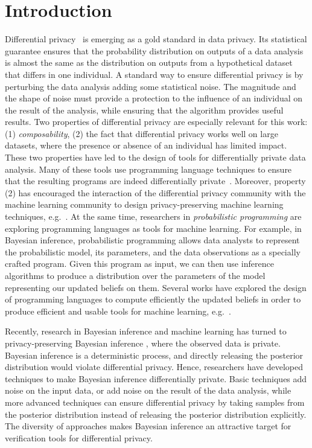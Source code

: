\documentclass{sig-alternate-05-2015}
\theoremstyle{plain}
\theoremstyle{definition}
\theoremstyle{corollary}
\begin{document}
\section{Introduction}
Differential privacy~\citep{DMNS06} is emerging as a gold standard in
data privacy. Its statistical guarantee ensures that the probability
distribution on outputs of a data analysis is almost the
same as the distribution on outputs from a hypothetical dataset that differs in one individual. A
standard way to ensure differential privacy is by
perturbing the data analysis adding some statistical noise. The
magnitude and the shape of noise must provide a protection to the influence of an
individual on the result of the analysis, while ensuring that
the algorithm provides useful results. Two properties of differential privacy are especially relevant for this work: (1)
\emph{composability}, (2) the fact that differential privacy works well on large
datasets, where the presence or absence of an individual has limited impact.
These two properties have led to the design of tools for
differentially private data analysis. Many of these tools use
programming language techniques to ensure that the resulting programs
are indeed differentially private~\citep{PINQ09,ReedPierce10,POPL:BKOZ12,GaboardiHHNP13,EignerM13,DBLP:conf/csfw/BartheDGKB13,BartheO13,BartheGAHRS15,conf/popl/EbadiSS15}. Moreover, property (2) has encouraged the
interaction of the differential privacy community with the machine
learning community to design privacy-preserving machine learning
techniques, e.g.~\citep{DworkRV10,Chaudhuri:2011,HardtLM12,Zhang:2014:PrivBayes}.
At the same time, researchers in \emph{probabilistic programming} are exploring
programming languages as tools for machine learning. For example, in Bayesian
inference, probabilistic programming allows data analysts to represent the
probabilistic model, its parameters,
and the data observations as a specially crafted program. Given this
program as input, we can then use inference algorithms to produce a distribution
over the parameters of the model representing our updated beliefs on them.
Several works have explored the design of programming languages to
compute efficiently the updated beliefs in order to produce efficient
and usable tools for machine learning,
e.g.~\citep{LunnTBS00,Pfeffer01,DBLP:conf/uai/GoodmanMRBT08,InferNET12,GordonGRRBG14,TolpinMW15}. 

Recently, research in Bayesian inference and machine learning has turned to
privacy-preserving Bayesian inference
\citep{DBLP:conf/nips/WilliamsM10,DimitrakakisNMR14,Zheng16,ZhangRD16},
where the observed data is private.  Bayesian inference is a deterministic
process, and directly releasing the posterior distribution would violate differential
privacy.  Hence, researchers have developed techniques to make Bayesian
inference differentially private.  Basic techniques add noise on the input data,
or add noise on the result of the data analysis, while more advanced techniques
can ensure differential privacy by taking samples from the posterior
distribution instead of releasing the posterior distribution explicitly. The
diversity of approaches makes Bayesian inference an attractive target for
verification tools for differential privacy.
\end{document}
